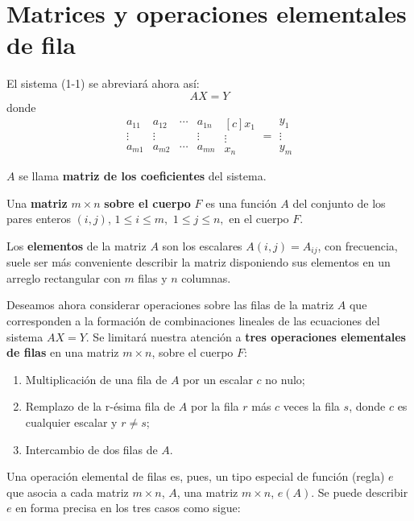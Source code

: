 \section{Matrices y operaciones elementales de fila}
El sistema (1-1) se abreviará ahora así:
$$AX=Y$$
donde 
$$
\begin{matrix}
    a_{11} & a_{12} & \cdots & a_{1n} \\
    \vdots & \vdots &  & \vdots \\
    a_{m1} & a_{m2} & \cdots & a_{mn}
\end{matrix} 
\begin{matrix}[c]
	x_1 \\
	\vdots \\
	x_n
\end{matrix} = 
\begin{matrix}
	y_1 \\
	\vdots \\
	y_m
\end{matrix}
$$

$A$ se llama \textbf{matriz de los coeficientes} del sistema.

    Una \textbf{matriz} $m\times n$ \textbf{sobre el cuerpo} $F$ es una función $A$ del conjunto de los pares enteros $(i,j)$, $1\leq i \leq m,$ $1\leq j \leq n,$ en el cuerpo $F$.

    Los \textbf{elementos} de la matriz $A$ son los escalares $A(i,j)=A_{ij}$, con frecuencia, suele ser más conveniente describir la matriz disponiendo sus elementos en un arreglo rectangular con $m$ filas y $n$ columnas.

Deseamos ahora considerar operaciones sobre las filas de la matriz $A$ que corresponden a la formación de combinaciones lineales de las ecuaciones del sistema $AX=Y$. Se limitará nuestra atención a \textbf{tres operaciones elementales de filas} en una matriz $m\times n$, sobre el cuerpo $F$:

    \begin{enumerate}[\bfseries 1.]
	\item Multiplicación de una fila de $A$ por un escalar $c$ no nulo;
	\item Remplazo de la r-ésima fila de $A$ por la fila $r$ más $c$ veces la fila $s$, donde $c$ es cualquier escalar y $r\neq s$;
	\item Intercambio de dos filas de $A$.
    \end{enumerate}

Una operación elemental de filas es, pues, un tipo especial de función (regla) $e$ que asocia a cada matriz $m\times n$, $A$, una matriz $m\times n$, $e(A)$. Se puede describir $e$ en forma precisa en los tres casos como sigue:

